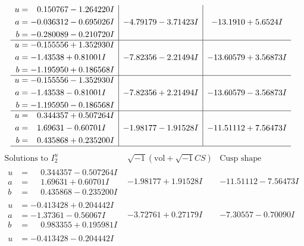 \documentclass[1p]{elsarticle_modified}
\theoremstyle{definition}
\newcommand{\I}{\sqrt{-1}}
\begin{document}
$$\begin{array}{c|c|c}
\begin{aligned}
u &= \phantom{-}0.150767 - 1.264220 I \\
a &= -0.036312 - 0.695026 I \\
b &= -0.280089 - 0.210720 I\end{aligned}
 & -4.79179 - 3.71423 I & -13.1910 + 5.6524 I \\ \hline\begin{aligned}
u &= -0.155556 + 1.352930 I \\
a &= -1.43538 + 0.81001 I \\
b &= -1.195950 + 0.186568 I\end{aligned}
 & -7.82356 - 2.21494 I & -13.60579 + 3.56873 I \\ \hline\begin{aligned}
u &= -0.155556 - 1.352930 I \\
a &= -1.43538 - 0.81001 I \\
b &= -1.195950 - 0.186568 I\end{aligned}
 & -7.82356 + 2.21494 I & -13.60579 - 3.56873 I \\ \hline\begin{aligned}
u &= \phantom{-}0.344357 + 0.507264 I \\
a &= \phantom{-}1.69631 - 0.60701 I \\
b &= \phantom{-}0.435868 + 0.235200 I\end{aligned}
 & -1.98177 - 1.91528 I & -11.51112 + 7.56473 I\\
 \hline 
 \end{array}$$\newpage$$\begin{array}{c|c|c}  
\text{Solutions to }I^u_{2}& \I (\text{vol} + \sqrt{-1}CS) & \text{Cusp shape}\\
 \hline 
\begin{aligned}
u &= \phantom{-}0.344357 - 0.507264 I \\
a &= \phantom{-}1.69631 + 0.60701 I \\
b &= \phantom{-}0.435868 - 0.235200 I\end{aligned}
 & -1.98177 + 1.91528 I & -11.51112 - 7.56473 I \\ \hline\begin{aligned}
u &= -0.413428 + 0.204442 I \\
a &= -1.37361 - 0.56067 I \\
b &= \phantom{-}0.983355 + 0.195981 I\end{aligned}
 & -3.72761 + 0.27179 I & -7.30557 - 0.70090 I \\ \hline\begin{aligned}
u &= -0.413428 - 0.204442 I \\

\end{aligned}
\end{array}$$
\end{document}
